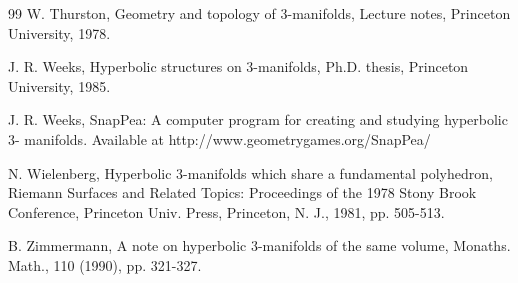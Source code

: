 \documentclass[reqno]{amsproc}  %
\begin{document}
\begin{thebibliography}{99}
 W. Thurston, Geometry and topology of 3-manifolds, Lecture notes, Princeton University, 1978.

 J. R. Weeks, Hyperbolic structures on 3-manifolds, Ph.D. thesis, Princeton University, 1985.

 J. R. Weeks, SnapPea: A computer program for creating and studying hyperbolic 3- manifolds. Available at http://www.geometrygames.org/SnapPea/

 N. Wielenberg, Hyperbolic 3-manifolds which share a fundamental polyhedron, Riemann Surfaces and Related Topics: Proceedings of the 1978 Stony Brook Conference, Princeton Univ. Press, Princeton, N. J., 1981, pp. 505-513.

 B. Zimmermann, A note on hyperbolic 3-manifolds of the same volume, Monaths. Math., 110 (1990), pp. 321-327.

\end{thebibliography}
\end{document}
